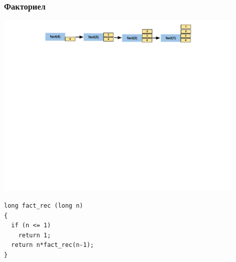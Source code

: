 \documentclass{beamer}
\begin{document}
\begin{frame}[fragile]
\frametitle{Факториел}

\includegraphics[width=12cm]{images/fact_stack}

\vspace{-150px}

\begin{lstlisting}
long fact_rec (long n)
{
  if (n <= 1)
    return 1;
  return n*fact_rec(n-1);
}
\end{lstlisting}

\end{frame}
\end{document}
